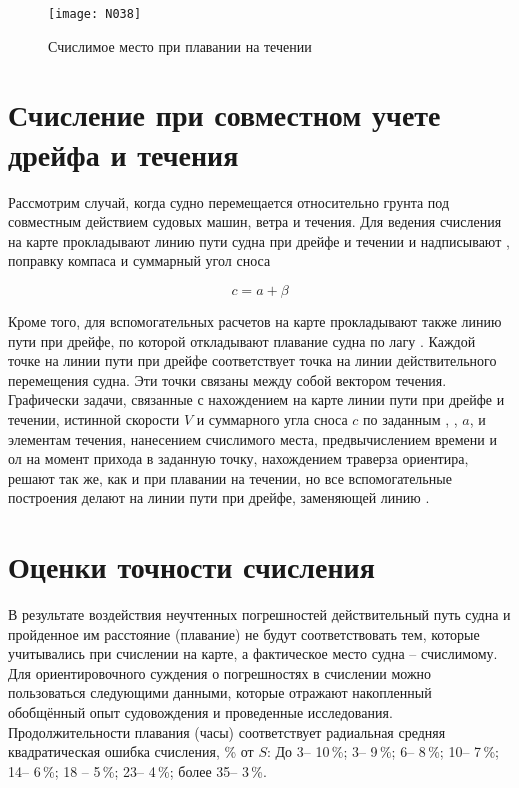\begin{figure}[htb]
  \centering{}
  \texttt{[image: N038]}
  \caption{Счислимое место при плавании на течении}
  \label{fig:N38}
\end{figure}

\section{Счисление при совместном учете дрейфа и течения}

Рассмотрим случай, когда судно перемещается относительно грунта под
совместным действием судовых машин, ветра и течения. Для ведения
счисления на карте прокладывают линию пути судна при дрейфе и течении
и надписывают \KK, поправку компаса и суммарный угол сноса

\begin{equation}
  c = a + \beta
\end{equation}

Кроме того, для вспомогательных расчетов на карте прокладывают также
линию пути при дрейфе, по которой откладывают плавание судна по лагу
. Каждой точке на линии пути при дрейфе соответствует точка
на линии действительного перемещения судна. Эти точки связаны между
собой вектором течения. Графически задачи, связанные с нахождением на
карте линии пути при дрейфе и течении, истинной скорости $V$ и
суммарного угла сноса $c$ по заданным \KK, , $a$, и
элементам течения, нанесением счислимого места, предвычислением
времени и ол на момент прихода в заданную точку, нахождением траверза
ориентира, решают так же, как и при плавании на течении, но все
вспомогательные построения делают на линии пути при дрейфе, заменяющей
линию \IK.

\section{Оценки точности счисления}

В результате воздействия неучтенных погрешностей действительный путь
судна и пройденное им расстояние (плавание) не будут соответствовать
тем, которые учитывались при счислении на карте, а фактическое место
судна \--- счислимому. Для ориентировочного суждения о погрешностях в
счислении можно пользоваться следующими данными, которые отражают
накопленный обобщённый опыт судовождения и проведенные
исследования. Продолжительности плавания (часы) соответствует
радиальная средняя квадратическая ошибка счисления, \% от $S$: До
3\thr \--- 10\,\%; 3\thr \--- 9\,\%; 6\thr \--- 8\,\%;
10\thr \--- 7\,\%; 14\thr \--- 6\,\%; 18\thr
\--- 5\,\%; 23\thr \--- 4\,\%; более 35\thr \--- 3\,\%.

